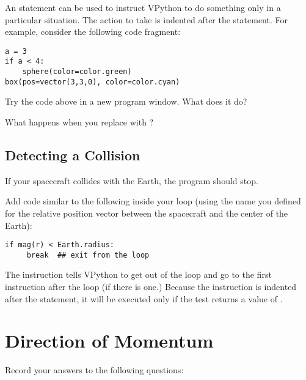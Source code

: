 \documentclass[10pt]{article}
\begin{document}
An  statement can be used to instruct VPython to do something only in a particular situation.  The action to take is indented after the  statement.  For example, consider the following code fragment:

\color{CodeColor}
\begin{Verbatim}[frame=single]
a = 3
if a < 4:
    sphere(color=color.green)
box(pos=vector(3,3,0), color=color.cyan)
\end{Verbatim}
\color{black}

\begin{compactitem}[\color{MIRed}$\Rightarrow$]
\item Try the code above in a new program window.  What does it do?   
\item What happens when you replace  with ?
\end{compactitem}

\subsection{Detecting a Collision}

If your spacecraft collides with the Earth, the program should stop.\\

\begin{compactitem}[\color{MIRed}$\Rightarrow$]
\item Add code similar to the following inside your loop (using the name you defined for the relative position vector between the spacecraft and the center of the Earth):   
\end{compactitem}


\color{CodeColor}
\begin{Verbatim}
if mag(r) < Earth.radius:
     break  ## exit from the loop
\end{Verbatim}
\color{black}

The  instruction tells VPython to get out of the loop and go to the first instruction after the loop (if there is one.)  Because the  instruction is indented after the  statement, it will be executed only if the  test returns a value of .


\section{Direction of Momentum}

Record your answers to the following questions:\\
\end{document}
